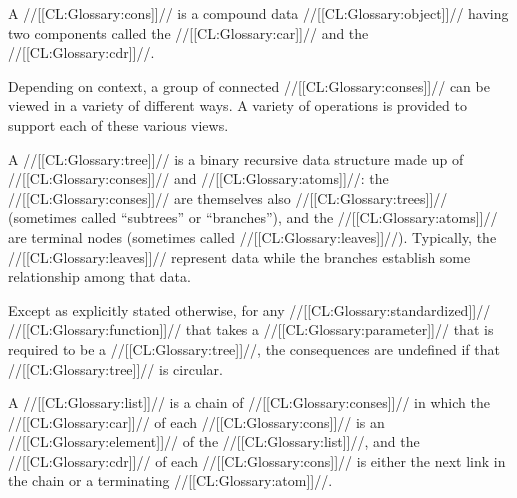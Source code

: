 

A //[[CL:Glossary:cons]]// is a compound data //[[CL:Glossary:object]]// 
having two components called the //[[CL:Glossary:car]]// and the //[[CL:Glossary:cdr]]//.


Depending on context, a group of connected //[[CL:Glossary:conses]]// can be viewed
in a variety of different ways.  A variety of operations is provided to
support each of these various views.


A //[[CL:Glossary:tree]]// is a binary recursive data structure made up of
//[[CL:Glossary:conses]]// and //[[CL:Glossary:atoms]]//:
the //[[CL:Glossary:conses]]// are themselves also //[[CL:Glossary:trees]]//
(sometimes called ``subtrees'' or ``branches''), and the //[[CL:Glossary:atoms]]//
are terminal nodes (sometimes called //[[CL:Glossary:leaves]]//). 
Typically, the //[[CL:Glossary:leaves]]// represent data while the branches 
establish some relationship among that data.



Except as explicitly stated otherwise,
for any //[[CL:Glossary:standardized]]// //[[CL:Glossary:function]]// that takes a //[[CL:Glossary:parameter]]//
that is required to be a //[[CL:Glossary:tree]]//,
the consequences are undefined
if that //[[CL:Glossary:tree]]// is circular.


\endsubsubsection%

\endsubsection%


A //[[CL:Glossary:list]]// is a chain of //[[CL:Glossary:conses]]// in which the //[[CL:Glossary:car]]// of each
//[[CL:Glossary:cons]]// is an //[[CL:Glossary:element]]// of the //[[CL:Glossary:list]]//, 
and the //[[CL:Glossary:cdr]]// of each //[[CL:Glossary:cons]]// is either the next
link in the chain or a terminating //[[CL:Glossary:atom]]//.  

